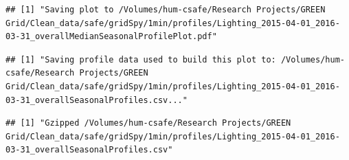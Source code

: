 \documentclass[]{article}
\begin{document}
\begin{verbatim}
## [1] "Saving plot to /Volumes/hum-csafe/Research Projects/GREEN Grid/Clean_data/safe/gridSpy/1min/profiles/Lighting_2015-04-01_2016-03-31_overallMedianSeasonalProfilePlot.pdf"
\end{verbatim}

\begin{verbatim}
## [1] "Saving profile data used to build this plot to: /Volumes/hum-csafe/Research Projects/GREEN Grid/Clean_data/safe/gridSpy/1min/profiles/Lighting_2015-04-01_2016-03-31_overallSeasonalProfiles.csv..."
\end{verbatim}

\begin{verbatim}
## [1] "Gzipped /Volumes/hum-csafe/Research Projects/GREEN Grid/Clean_data/safe/gridSpy/1min/profiles/Lighting_2015-04-01_2016-03-31_overallSeasonalProfiles.csv"
\end{verbatim}
\end{document}
